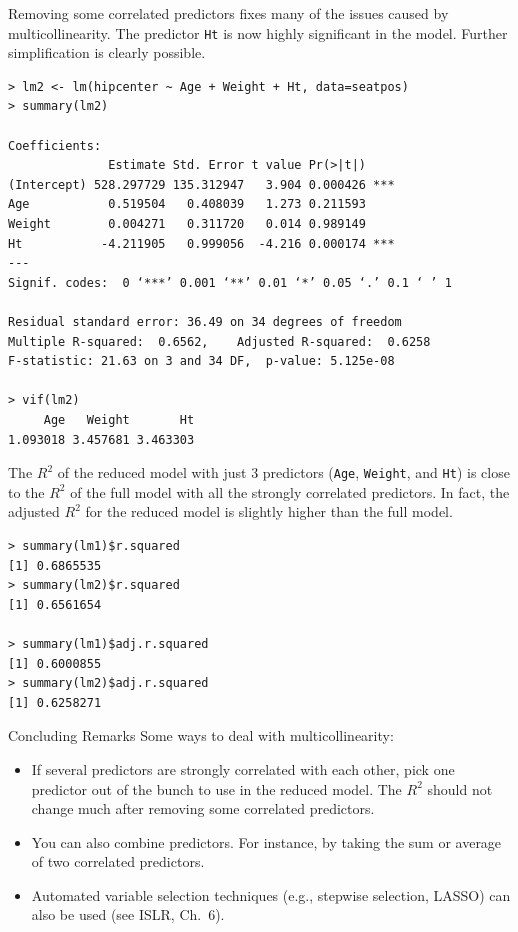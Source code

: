 \documentclass[10pt]{beamer}\usepackage[]{graphicx}\usepackage[]{color}
\begin{document}
\begin{frame}[fragile]
Removing some correlated predictors fixes many of the issues caused by multicollinearity.  The predictor \texttt{Ht} is now highly significant in the model.  Further simplification is clearly possible.\\
\scriptsize
\begin{verbatim}
> lm2 <- lm(hipcenter ~ Age + Weight + Ht, data=seatpos)
> summary(lm2)

Coefficients:
              Estimate Std. Error t value Pr(>|t|)    
(Intercept) 528.297729 135.312947   3.904 0.000426 ***
Age           0.519504   0.408039   1.273 0.211593    
Weight        0.004271   0.311720   0.014 0.989149    
Ht           -4.211905   0.999056  -4.216 0.000174 ***
---
Signif. codes:  0 ‘***’ 0.001 ‘**’ 0.01 ‘*’ 0.05 ‘.’ 0.1 ‘ ’ 1

Residual standard error: 36.49 on 34 degrees of freedom
Multiple R-squared:  0.6562,	Adjusted R-squared:  0.6258 
F-statistic: 21.63 on 3 and 34 DF,  p-value: 5.125e-08

> vif(lm2)
     Age   Weight       Ht 
1.093018 3.457681 3.463303 
\end{verbatim}
\end{frame}

\begin{frame}[fragile]
The $R^2$ of the reduced model with just 3 predictors (\texttt{Age}, \texttt{Weight}, and \texttt{Ht}) is close to the $R^2$ of the full model with all the strongly correlated predictors.  In fact, the adjusted $R^2$ for the reduced model is slightly higher than the full model.      
\begin{verbatim}
> summary(lm1)$r.squared
[1] 0.6865535
> summary(lm2)$r.squared
[1] 0.6561654

> summary(lm1)$adj.r.squared
[1] 0.6000855
> summary(lm2)$adj.r.squared
[1] 0.6258271
\end{verbatim}
\end{frame}

\begin{frame}{Concluding Remarks}
Some ways to deal with multicollinearity:
\vspace{5pt}
\begin{itemize}
\item If several predictors are strongly correlated with each other, pick one predictor out of the bunch to use in the reduced model.  The $R^2$ should not change much after removing some correlated predictors.
\vspace{5pt}
\item You can also combine predictors.  For instance, by taking the sum or average of two correlated predictors.
\vspace{5pt}
\item Automated variable selection techniques (e.g., stepwise selection, LASSO) can also be used (see ISLR, Ch.~6).
\end{itemize}
\end{frame}
\end{document}
